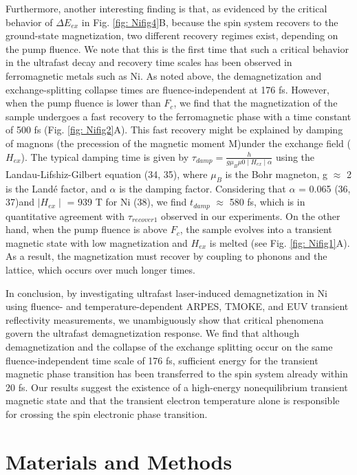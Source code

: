 Furthermore, another interesting finding is that, as evidenced by the critical behavior of $\Delta E_{ex}$ in Fig. \ref{fig: Nifig4}B, because the spin system recovers to the ground-state magnetization, two different recovery regimes exist, depending on the pump fluence. We note that this is the first time that such a critical behavior in the ultrafast decay and recovery time scales has been observed in ferromagnetic metals such as Ni. As noted above, the demagnetization and exchange-splitting collapse times are fluence-independent at 176 fs. However, when the pump fluence is lower than $F_{c}$, we find that the magnetization of the sample undergoes a fast recovery to the ferromagnetic phase with a time constant of 500 fs (Fig. \ref{fig: Nifig2}A). This fast recovery might be explained by damping of magnons (the precession of the magnetic moment M)under the exchange field ($H_{ex}$). The typical damping time is given by $\tau_{damp} = \frac{h}{g\mu_{B}\mu{0}\mid H_{ex}\mid\alpha}$ using the Landau-Lifshiz-Gilbert equation (34, 35), where $\mu_{B}$ is the Bohr magneton, g $\approx$ 2 is the Landé factor, and $\alpha$ is the damping factor. Considering that $\alpha$ = 0.065 (36, 37)and $\mid H_{ex}\mid$ = 939 T for Ni (38), we find $t_{damp}$ $\approx$ 580 fs, which is in quantitative agreement with $\tau_{recover1}$ observed in our experiments. On the other hand, when the pump fluence is above $F_c$, the sample evolves into a transient magnetic state with low magnetization and $H_{ex}$ is melted (see Fig. \ref{fig: Nifig1}A). As a result, the magnetization must recover by coupling to phonons and the lattice, which occurs over much longer times.

In conclusion, by investigating ultrafast laser-induced demagnetization in Ni using fluence- and temperature-dependent ARPES, TMOKE, and EUV transient reflectivity measurements, we unambiguously show that critical phenomena govern the ultrafast demagnetization response. We find that although demagnetization and the collapse of the exchange splitting occur on the same fluence-independent time scale of 176 fs, sufficient energy for the transient magnetic phase transition has been transferred to the spin system already within 20 fs. Our results suggest the existence of a high-energy nonequilibrium transient magnetic state and that the transient electron temperature alone is responsible for crossing the spin electronic phase transition.

\section{Materials and Methods}
